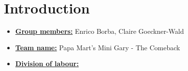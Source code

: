 \newif\ifshowsolutions
\showsolutionstrue

\newcommand{\boldline}[1]{\underline{\textbf{#1}}}



\pagestyle{fancy}





\section{Introduction}
\medskip
\begin{itemize}

    \item \boldline{Group members:} Enrico Borba, Claire Goeckner-Wald \\
    
    \item \boldline{Team name:} Papa Mart's Mini Gary - The Comeback \\
    
    \item \boldline{Division of labour:} \\

\end{itemize}


